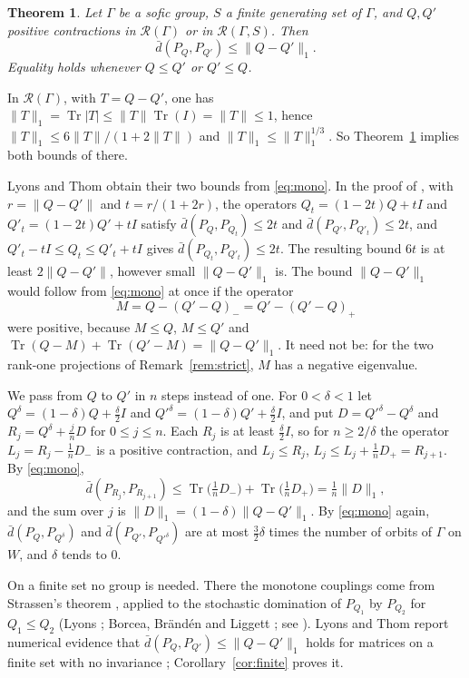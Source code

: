 \documentclass[11pt]{amsart}
\newtheorem{theorem}{Theorem}[section]
\theoremstyle{remark}
\numberwithin{equation}{section}
\newcommand{\Tr}{\operatorname{Tr}}
\newcommand{\dbar}{\bar d}
\newcommand{\R}{\mathcal{R}}
\begin{document}
\begin{theorem}\label{thm:main}
Let $\Gamma$ be a sofic group, $S$ a finite generating set of $\Gamma$, and $Q,Q'$ positive contractions in $\R(\Gamma)$ or in $\R(\Gamma,S)$. Then
\[
\dbar(P_Q,P_{Q'})\le\|Q-Q'\|_1 .
\]
Equality holds whenever $Q\le Q'$ or $Q'\le Q$.
\end{theorem}

In $\R(\Gamma)$, with $T=Q-Q'$, one has $\|T\|_1=\Tr|T|\le\|T\|\Tr(I)=\|T\|\le1$, hence $\|T\|_1\le6\|T\|/(1+2\|T\|)$ and $\|T\|_1\le\|T\|_1^{1/3}$. So Theorem~\ref{thm:main} implies both bounds of \cite{LT16} there.

Lyons and Thom obtain their two bounds from \eqref{eq:mono}. In the proof of \cite[Lemma~7.8]{LT16}, with $r=\|Q-Q'\|$ and $t=r/(1+2r)$, the operators $Q_t=(1-2t)Q+tI$ and $Q'_t=(1-2t)Q'+tI$ satisfy $\dbar(P_Q,P_{Q_t})\le2t$ and $\dbar(P_{Q'},P_{Q'_t})\le2t$, and $Q'_t-tI\le Q_t\le Q'_t+tI$ gives $\dbar(P_{Q_t},P_{Q'_t})\le2t$. The resulting bound $6t$ is at least $2\|Q-Q'\|$, however small $\|Q-Q'\|_1$ is. The bound $\|Q-Q'\|_1$ would follow from \eqref{eq:mono} at once if the operator
\[
M=Q-(Q'-Q)_-=Q'-(Q'-Q)_+
\]
were positive, because $M\le Q$, $M\le Q'$ and $\Tr(Q-M)+\Tr(Q'-M)=\|Q-Q'\|_1$. It need not be: for the two rank-one projections of Remark~\ref{rem:strict}, $M$ has a negative eigenvalue.

We pass from $Q$ to $Q'$ in $n$ steps instead of one. For $0<\delta<1$ let $Q^\delta=(1-\delta)Q+\frac\delta2I$ and $Q'^\delta=(1-\delta)Q'+\frac\delta2I$, and put $D=Q'^\delta-Q^\delta$ and $R_j=Q^\delta+\frac jnD$ for $0\le j\le n$. Each $R_j$ is at least $\frac\delta2I$, so for $n\ge2/\delta$ the operator $L_j=R_j-\frac1nD_-$ is a positive contraction, and $L_j\le R_j$, $L_j\le L_j+\frac1nD_+=R_{j+1}$. By \eqref{eq:mono},
\[
\dbar(P_{R_j},P_{R_{j+1}})\le\Tr\bigl(\tfrac1nD_-\bigr)+\Tr\bigl(\tfrac1nD_+\bigr)=\tfrac1n\|D\|_1 ,
\]
and the sum over $j$ is $\|D\|_1=(1-\delta)\|Q-Q'\|_1$. By \eqref{eq:mono} again, $\dbar(P_Q,P_{Q^\delta})$ and $\dbar(P_{Q'},P_{Q'^\delta})$ are at most $\frac32\delta$ times the number of orbits of $\Gamma$ on $W$, and $\delta$ tends to $0$.

On a finite set no group is needed. There the monotone couplings come from Strassen's theorem \cite{St65}, applied to the stochastic domination of $P_{Q_1}$ by $P_{Q_2}$ for $Q_1\le Q_2$ (Lyons \cite{Ly03}; Borcea, Br\"and\'en and Liggett \cite{BBL09}; see \cite[Theorem~2.1]{LT16}). Lyons and Thom report numerical evidence that $\dbar(P_Q,P_{Q'})\le\|Q-Q'\|_1$ holds for matrices on a finite set with no invariance \cite[end of Section~7]{LT16}; Corollary~\ref{cor:finite} proves it.
\end{document}
